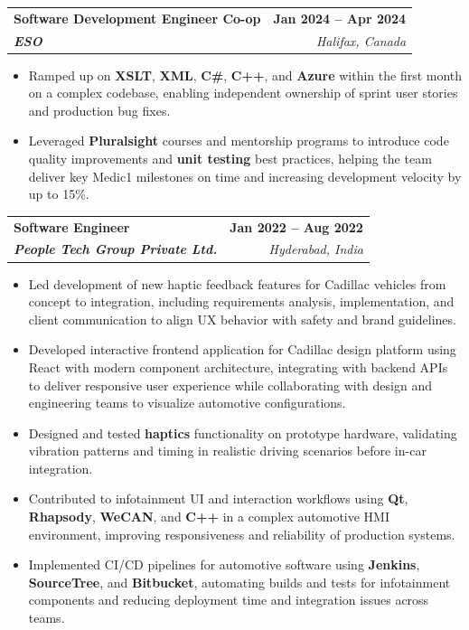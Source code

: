 \documentclass[letterpaper,11pt]{article}
\makeatletter
\newcommand{\resumeItem}[1]{
  \item\small{
    {#1 \vspace{-2pt}}
  }
}
\newcommand{\resumeSubheading}[4]{
  \vspace{-2pt}\item
    \begin{tabular*}{1.0\textwidth}[t]{l@{\extracolsep{\fill}}r}
      \textbf{#1} & \textbf{\small #2} \\
      \textit{\small#3} & \textit{\small #4} \\
    \end{tabular*}\vspace{-7pt}
}
\newcommand{\resumeItemListStart}{\begin{itemize}}
\newcommand{\resumeItemListEnd}{\end{itemize}\vspace{-5pt}}
\makeatother
\begin{document}
    \resumeSubheading
      {\textbf{Software Development Engineer Co-op}}{\textbf{Jan 2024 -- Apr 2024}}
      {\textbf{ESO}}{Halifax, Canada}
      \resumeItemListStart
        \resumeItem{Ramped up on \textbf{XSLT}, \textbf{XML}, \textbf{C\#}, \textbf{C++}, and \textbf{Azure} within the first month on a complex codebase, enabling independent ownership of sprint user stories and production bug fixes.}
        \resumeItem{Leveraged \textbf{Pluralsight} courses and mentorship programs to introduce code quality improvements and \textbf{unit testing} best practices, helping the team deliver key Medic1 milestones on time and increasing development velocity by up to 15\%.}
      \resumeItemListEnd

    \resumeSubheading
      {\textbf{Software Engineer}}{\textbf{Jan 2022 -- Aug 2022}}
      {\textbf{People Tech Group Private Ltd.}}{Hyderabad, India}
      \resumeItemListStart
        \resumeItem{Led development of new haptic feedback features for Cadillac vehicles from concept to integration, including requirements analysis, implementation, and client communication to align UX behavior with safety and brand guidelines.}
        \resumeItem{Developed interactive frontend application for Cadillac design platform using React with modern component architecture, integrating with backend APIs to deliver responsive user experience while collaborating with design and engineering teams to visualize automotive configurations.}
        \resumeItem{Designed and tested \textbf{haptics} functionality on prototype hardware, validating vibration patterns and timing in realistic driving scenarios before in-car integration.}
        \resumeItem{Contributed to infotainment UI and interaction workflows using \textbf{Qt}, \textbf{Rhapsody}, \textbf{WeCAN}, and \textbf{C++} in a complex automotive HMI environment, improving responsiveness and reliability of production systems.}
        \resumeItem{Implemented CI/CD pipelines for automotive software using \textbf{Jenkins}, \textbf{SourceTree}, and \textbf{Bitbucket}, automating builds and tests for infotainment components and reducing deployment time and integration issues across teams.}
      \resumeItemListEnd
\end{document}
